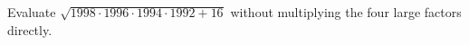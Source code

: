 Evaluate $\sqrt{1998\cdot1996\cdot1994\cdot1992+16}$ without multiplying the four large factors directly.
